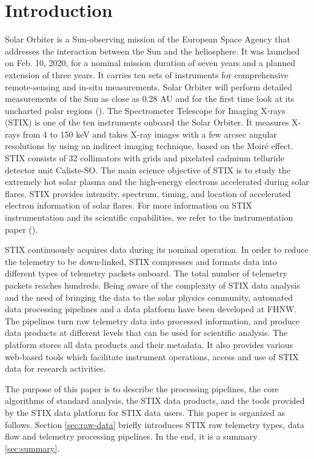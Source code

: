 \documentclass[referee]{aa} %
\begin{document}
\section{Introduction}
Solar Orbiter is a Sun-observing mission of the European Space Agency that 
addresses the interaction between the Sun and the heliosphere.
It was launched on Feb. 10, 2020, for a nominal mission duration of seven years and a planned 
extension of three years. It carries ten sets of instruments for comprehensive
remote-sensing and in-situ measurements. 
Solar Orbiter will perform detailed measurements of the Sun as close as 0.28 AU and for the first time look at its uncharted polar regions (\cite{SolarOrbiter2020}).  
The Spectrometer Telescope for Imaging X-rays (STIX) is one of the ten instruments onboard the Solar Orbiter.  
It measures X-rays from 4 to 150 keV and takes X-ray images with a few arcsec angular resolutions by using an indirect imaging technique,
based on the Moiré effect.  STIX consists of 32 collimators with grids and pixelated cadmium telluride detector unit Caliste-SO. 
The main science objective of STIX is to study the extremely hot solar plasma and the high-energy electrons accelerated during solar flares. STIX provides intensity,  spectrum, timing, and location of accelerated electron information of solar flares.
For more information on STIX instrumentation and its scientific capabilities, we refer to the instrumentation paper (\cite{StixInstrument}).


STIX continuously acquires data during its nominal operation. 
In order to reduce the telemetry to be down-linked, STIX compresses and formats data into different types of telemetry packets onboard.
 The total number of telemetry packets reaches hundreds. 
Being aware of the complexity of STIX data analysis and the need of bringing the data to the 
solar physics community, automated data processing pipelines and a data platform have been developed at FHNW. 
The pipelines turn raw telemetry data into processed information,  and produce data products at different levels
 that can be used for scientific analysis.
 The platform stores all data products and their metadata. 
 It also provides various web-based tools which facilitate instrument operations,
  access and use of STIX data for research activities.

 The purpose of this paper is to describe the processing pipelines,
 the core algorithms of standard analysis, the STIX data products, and the tools provided by the 
 STIX data platform for STIX data users.
This paper is organized as follows. Section \ref{sec:raw-data} briefly introduces STIX raw telemetry types, data flow and
telemetry processing pipelines. 
In the end, it is a summary \ref{sec:summary}.
\end{document}
